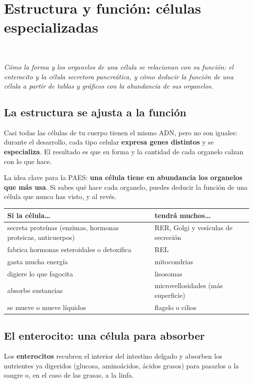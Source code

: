 \section[Estructura y función: células especializadas]{Estructura y función: células especializadas}
\modcomun\ \ {\color{gris}\itshape Cómo la forma y los organelos de una célula se relacionan con su función: el enterocito y la célula secretora pancreática, y cómo deducir la función de una célula a partir de tablas y gráficos con la abundancia de sus organelos.\par}
\subsection{La estructura se ajusta a la función}
Casi todas las células de tu cuerpo tienen el mismo ADN, pero no son iguales: durante el desarrollo, cada tipo celular \textbf{expresa genes distintos} y se \textbf{especializa}. El resultado es que su forma y la cantidad de cada organelo calzan con lo que hace.

 

La idea clave para la PAES: \textbf{una célula tiene en abundancia los organelos que más usa}. Si sabes qué hace cada organelo, puedes deducir la función de una célula que nunca has visto, y al revés.

  
\begin{center}\small
\begin{tabularx}{\linewidth}{@{}>{\raggedright\arraybackslash\hsize=1.07\hsize}X>{\raggedright\arraybackslash\hsize=0.93\hsize}X@{}}
\toprule
\textbf{Si la célula\dots{}} & \textbf{tendrá muchos\dots{}} \\
\midrule
secreta proteínas (enzimas, hormonas proteicas, anticuerpos) & RER, Golgi y vesículas de secreción \\
fabrica hormonas esteroidales o detoxifica & REL \\
gasta mucha energía & mitocondrias \\
digiere lo que fagocita & lisosomas \\
absorbe sustancias & microvellosidades (más superficie) \\
se mueve o mueve líquidos & flagelo o cilios \\
\bottomrule
\end{tabularx}
\end{center}
\subsection{El enterocito: una célula para absorber}
Los \textbf{enterocitos} recubren el interior del intestino delgado y absorben los nutrientes ya digeridos (glucosa, aminoácidos, ácidos grasos) para pasarlos a la sangre o, en el caso de las grasas, a la linfa.

